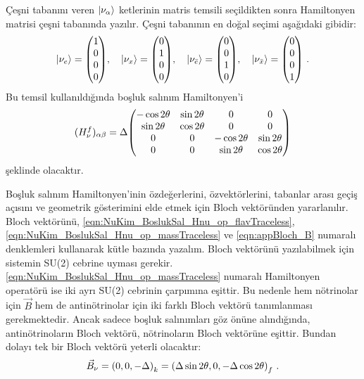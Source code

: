 Çeşni tabanını veren $ \ket{\nu_{\alpha}} $ ketlerinin matris temsili seçildikten sonra Hamiltonyen matrisi çeşni tabanında yazılır. Çeşni tabanının en doğal seçimi aşağıdaki gibidir:
\begin{equation}\label{eqn:ket_alpha}
	\ket{\nu_{e}} = \mqty(1\\0\\0\\0) \text{,}\quad \ket{\nu_{x}} = \mqty(0\\1\\0\\0) \text{,}\quad \ket{\nu_{\bar{e}}} = \mqty(0\\0\\1\\0) \text{,}\quad \ket{\nu_{\bar{x}}} = \mqty(0\\0\\0\\1) \text{ .}
\end{equation}
Bu temsil kullanıldığında boşluk salınım Hamiltonyen'i
\begin{equation}
	(H^{f}_{\nu})_{\alpha\beta} = \Delta \mqty(-\cos 2\theta & \sin 2\theta & 0 & 0\\\sin 2\theta & \cos 2\theta & 0 & 0
	\\0 & 0 & -\cos 2\theta & \sin 2\theta\\ 0 & 0 & \sin 2\theta & \cos 2\theta )
\end{equation}
şeklinde olacaktır.

Boşluk salınım Hamiltonyen'inin özdeğerlerini, özvektörlerini, tabanlar arası geçiş açısını ve geometrik gösterimini elde etmek için Bloch vektöründen yararlanılır. Bloch vektörünü, \eqref{eqn:NuKim_BoslukSal_Hnu_op_flavTraceless}, \eqref{eqn:NuKim_BoslukSal_Hnu_op_massTraceless} ve \eqref{eqn:appBloch_B} numaralı denklemleri kullanarak kütle bazında yazalım. Bloch vektörünü yazılabilmek için sistemin SU(2) cebrine uyması gerekir. \eqref{eqn:NuKim_BoslukSal_Hnu_op_massTraceless} numaralı Hamiltonyen operatörü ise iki ayrı SU(2) cebrinin çarpımına eşittir. Bu nedenle hem nötrinolar için $ \vec{B} $ hem de antinötrinolar için iki farklı Bloch vektörü tanımlanması gerekmektedir. Ancak sadece boşluk salınımları göz önüne alındığında, antinötrinoların Bloch vektörü, nötrinoların Bloch vektörüne eşittir. Bundan dolayı tek bir Bloch vektörü yeterli olacaktır:
\begin{equation}
	\vec{B}_{\nu} = \qty(0,0,-\Delta)_{k} = \qty(\Delta \sin 2\theta, 0, -\Delta \cos 2\theta)_{f} \text{ .}
\end{equation}

